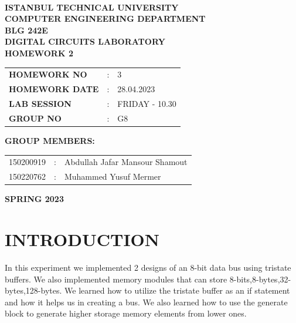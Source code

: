 \documentclass[pdftex,12pt,a4paper]{article}
\begin{document}
\begin{titlepage}
\begin{center}
\textbf{}\\
\textbf{\Large{ISTANBUL TECHNICAL UNIVERSITY}}\\
\vspace{0.5cm}
\textbf{\Large{COMPUTER ENGINEERING DEPARTMENT}}\\
\vspace{2cm}
\textbf{\Large{BLG 242E\\ DIGITAL CIRCUITS LABORATORY\\ HOMEWORK 2}}\\
\vspace{2.8cm}
\begin{table}[ht]
\centering
\Large{
\begin{tabular}{lcl}
\textbf{HOMEWORK NO}  & : & 3 \\
\textbf{HOMEWORK DATE}  & : & 28.04.2023\\
\textbf{LAB SESSION}  & : & FRIDAY - 10.30 \\
\textbf{GROUP NO}  & : & G8 \\
\end{tabular}}
\end{table}
\vspace{1cm}
\textbf{\Large{GROUP MEMBERS:}}\\
\begin{table}[ht]
\centering
\Large{
\begin{tabular}{rcl}
150200919  & : & Abdullah Jafar Mansour Shamout \\
150220762  & : & Muhammed Yusuf Mermer  \\
\end{tabular}}
\end{table}
\vspace{2.8cm}
\textbf{\Large{SPRING 2023}}

\end{center}

\end{titlepage}

\thispagestyle{empty}
\setcounter{tocdepth}{4}
\tableofcontents
\clearpage

\setcounter{page}{1}

\section{INTRODUCTION} 
In this experiment we implemented 2 designs of an 8-bit data bus using tristate buffers. We also implemented memory modules that can store 8-bits,8-bytes,32-bytes,128-bytes. We learned how to utilize the tristate buffer as an if statement and how it helps us in creating a bus. We also learned how to use the generate block to generate higher storage memory elements from lower ones.
\end{document}
